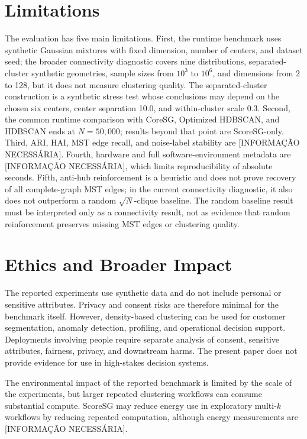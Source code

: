 \documentclass[11pt]{article}
\begin{document}
\section{Limitations}

The evaluation has five main limitations. First, the runtime benchmark uses synthetic Gaussian mixtures with fixed dimension, number of centers, and dataset seed; the broader connectivity diagnostic covers nine distributions, separated-cluster synthetic geometries, sample sizes from \(10^3\) to \(10^6\), and dimensions from 2 to 128, but it does not measure clustering quality. The separated-cluster construction is a synthetic stress test whose conclusions may depend on the chosen six centers, center separation 10.0, and within-cluster scale 0.3. Second, the common runtime comparison with CoreSG, Optimized HDBSCAN, and HDBSCAN ends at \(N=50{,}000\); results beyond that point are ScoreSG-only. Third, ARI, HAI, MST edge recall, and noise-label stability are [INFORMAÇÃO NECESSÁRIA]. Fourth, hardware and full software-environment metadata are [INFORMAÇÃO NECESSÁRIA], which limits reproducibility of absolute seconds. Fifth, anti-hub reinforcement is a heuristic and does not prove recovery of all complete-graph MST edges; in the current connectivity diagnostic, it also does not outperform a random \(\sqrt{N}\)-clique baseline. The random baseline result must be interpreted only as a connectivity result, not as evidence that random reinforcement preserves missing MST edges or clustering quality.

\section{Ethics and Broader Impact}

The reported experiments use synthetic data and do not include personal or sensitive attributes. Privacy and consent risks are therefore minimal for the benchmark itself. However, density-based clustering can be used for customer segmentation, anomaly detection, profiling, and operational decision support. Deployments involving people require separate analysis of consent, sensitive attributes, fairness, privacy, and downstream harms. The present paper does not provide evidence for use in high-stakes decision systems.

The environmental impact of the reported benchmark is limited by the scale of the experiments, but larger repeated clustering workflows can consume substantial compute. ScoreSG may reduce energy use in exploratory multi-\(k\) workflows by reducing repeated computation, although energy measurements are [INFORMAÇÃO NECESSÁRIA].
\end{document}
